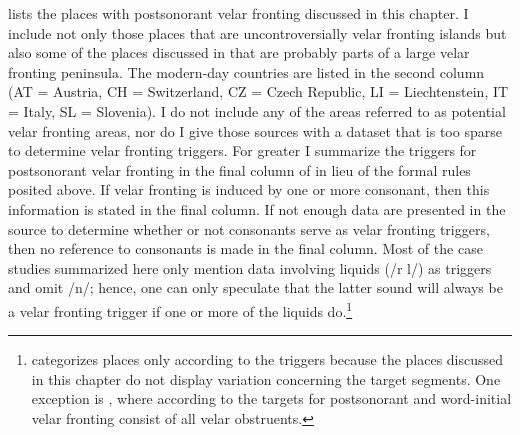  lists the places with postsonorant velar fronting discussed in this chapter. I include not only those places that are uncontroversially velar fronting islands but also some of the places discussed in  that are probably parts of a large velar fronting peninsula. The modern-day countries are listed in the second column (AT = Austria, CH = Switzerland, CZ = Czech Republic, LI = Liechtenstein, IT = Italy, SL = Slovenia). I do not include any of the areas referred to as potential velar fronting areas, nor do I give those sources with a dataset that is too sparse to determine velar fronting triggers. For greater  I summarize the triggers for postsonorant velar fronting in the final column of  in lieu of the formal rules posited above. If velar fronting is induced by one or more consonant, then this information is stated in the final column. If not enough data are presented in the source to determine whether or not consonants serve as velar fronting triggers, then no reference to consonants is made in the final column. Most of the case studies summarized here only mention data involving liquids (/r l/) as triggers and omit /n/; hence, one can only speculate that the latter sound will always be a velar fronting trigger if one or more of the liquids do.\footnote{ categorizes places only according to the triggers because the places discussed in this chapter do not display variation concerning the target segments. One exception is , where according to \citet{Lipold1984} the targets for postsonorant and word-initial velar fronting consist of all velar obstruents.}

